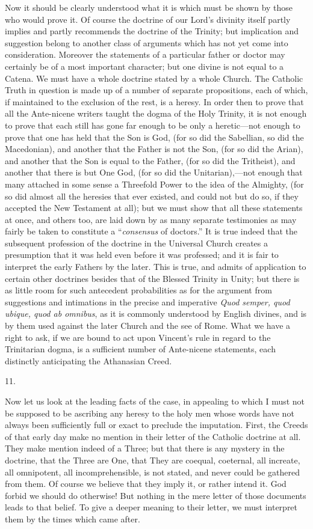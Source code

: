 Now it should be clearly understood what it is which
must be shown by those who would prove it. Of course the
doctrine of our Lord's divinity itself partly implies and
partly recommends the doctrine of the Trinity; but
implication and suggestion belong to another class of
arguments which has not yet come into consideration.
Moreover the statements of a particular father or doctor
may certainly be of a most important character; but one
divine is not equal to a Catena. We must have a whole
doctrine stated by a whole Church. The Catholic Truth in
question is made up of a number of separate propositions,
each of which, if maintained to the exclusion of the
rest, is a heresy. In order then to prove that all the
Ante-nicene writers taught the dogma of the Holy Trinity,
it is not enough to prove that each still has gone far
enough to be only a heretic—not enough to prove that
one has held that the Son is God, (for so did the
Sabellian, so did the Macedonian), and another that the
Father is not the Son, (for so did the Arian), and
another that the Son is equal to the Father, (for so did
the Tritheist), and another that there is but One God,
(for so did the Unitarian),—not enough that many
attached in some sense a Threefold Power to the idea of
the Almighty, (for so did almost all the heresies that
ever existed, and could not but do so, if they accepted
the New Testament at all); but we must show that all
these statements at once, and others too, are laid down
by as many separate testimonies as may fairly be taken to
constitute a ``\emph{consensus} of doctors.'' It
is true indeed that the subsequent profession of the
doctrine in the Universal Church creates a presumption
that it was held even before it was professed; and it is
fair to interpret the early Fathers by the later. This is
true, and admits of application to certain other
doctrines besides that of the Blessed Trinity in Unity;
but there is as little room for such antecedent
probabilities as for the argument from suggestions and
intimations in the precise and imperative \emph{Quod semper,
quod ubique, quod ab omnibus}, as it is commonly
understood by English divines, and is by them used
against the later Church and the see of Rome. What we
have a right to ask, if we are bound to act upon
Vincent's rule in regard to the Trinitarian dogma, is a
sufficient number of Ante-nicene statements, each
distinctly anticipating the Athanasian Creed.

11.

Now let us look at the leading facts of the case, in
appealing to which I must not be supposed to be ascribing
any heresy to the holy men whose words have not always
been sufficiently full or exact to preclude the
imputation. First, the Creeds of that early day make no
mention in their letter of the Catholic doctrine at all.
They make mention indeed of a Three; but that there is
any mystery in the doctrine, that the Three are One, that
They are coequal, coeternal, all increate, all
omnipotent, all incomprehensible, is not stated, and
never could be gathered from them. Of course we believe
that they imply it, or rather intend it. God forbid we
should do otherwise! But nothing in the mere letter of
those documents leads to that belief. To give a deeper
meaning to their letter, we must interpret them by the
times which came after.

